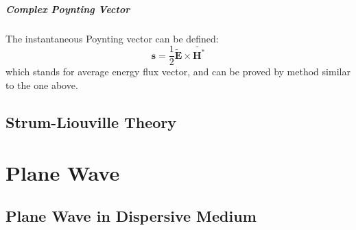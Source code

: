 \documentclass[11pt,a4paper,oneside]{book}
\begin{document}
\paragraph{Complex Poynting Vector} The instantaneous Poynting vector can be defined:\begin{equation}
	\mathbf{s}=\frac{1}{2}\mathbf{\tilde{E}}\times\mathbf{\tilde{H^*}}
\end{equation}which stands for average energy flux vector, and can be proved by method similar to the one above.
\section{Strum-Liouville Theory}




\chapter{Plane Wave}
\section{Plane Wave in Dispersive Medium}
\end{document}

